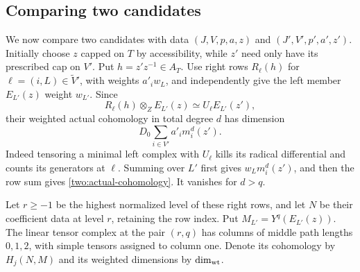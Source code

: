 \subsection{Comparing two candidates}

We now compare two candidates with data
$(J,V,p,a,z)$ and $(J',V',p',a',z')$.  Initially choose $z$ capped
on $T$ by accessibility, while $z'$ need only have its prescribed
cap on $V'$.  Put $h=z'z^{-1}\in A_T$.  Use right rows
$R_\ell(h)$ for $\ell=(i,L)\in\widetilde V'$, with weights
$a'_iw_L$, and independently give the left member $E_{L'}(z)$
weight $w_{L'}$.  Since
\[
 R_\ell(h)\otimes_ZE_{L'}(z)\simeq U_\ell E_{L'}(z'),
\]
their weighted actual cohomology in total degree $d$ has dimension
\begin{equation}
 D_0\sum_{i\in V'}a'_i m_i^d(z').
 \label{two:actual-cohomology}
\end{equation}
Indeed tensoring a minimal left complex with $U_\ell$ kills its
radical differential and counts its generators at $\ell$.  Summing
over $L'$ first gives $w_Lm_i^d(z')$, and then the row sum gives
\eqref{two:actual-cohomology}.  It vanishes for $d>q$.

Let $r\ge-1$ be the highest normalized level of these right rows,
and let $N$ be their coefficient data at level $r$, retaining the
row index.  Put $M_{L'}=Y^q(E_{L'}(z))$.  The linear tensor complex
at the pair $(r,q)$ has columns of middle path lengths $0,1,2$,
with simple tensors assigned to column one.  Denote its cohomology
by $H_j(N,M)$ and its weighted dimensions by $\dim_{\mathrm{wt}}$.


